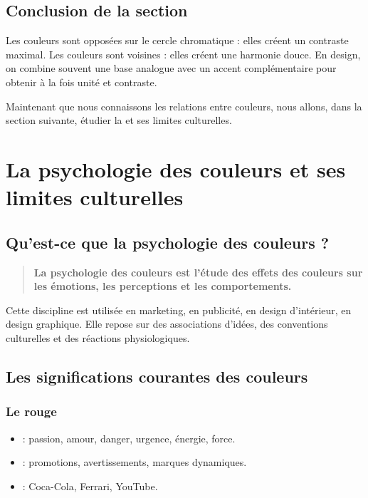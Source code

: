 \subsection*{Conclusion de la section}

\begin{retenir}
Les couleurs  sont opposées sur le cercle chromatique : elles créent un contraste maximal. Les couleurs  sont voisines : elles créent une harmonie douce. En design, on combine souvent une base analogue avec un accent complémentaire pour obtenir à la fois unité et contraste.
\end{retenir}

Maintenant que nous connaissons les relations entre couleurs, nous allons, dans la section suivante, étudier la  et ses limites culturelles.

\section{La psychologie des couleurs et ses limites culturelles}

\subsection{Qu'est-ce que la psychologie des couleurs ?}

\begin{quote}
\textbf{La psychologie des couleurs est l'étude des effets des couleurs sur les émotions, les perceptions et les comportements.}
\end{quote}

Cette discipline est utilisée en marketing, en publicité, en design d'intérieur, en design graphique. Elle repose sur des associations d'idées, des conventions culturelles et des réactions physiologiques.

\subsection{Les significations courantes des couleurs}

\subsubsection{Le rouge}

\begin{itemize}
    \item {} : passion, amour, danger, urgence, énergie, force.
    \item {} : promotions, avertissements, marques dynamiques.
    \item {} : Coca-Cola, Ferrari, YouTube.
\end{itemize}

